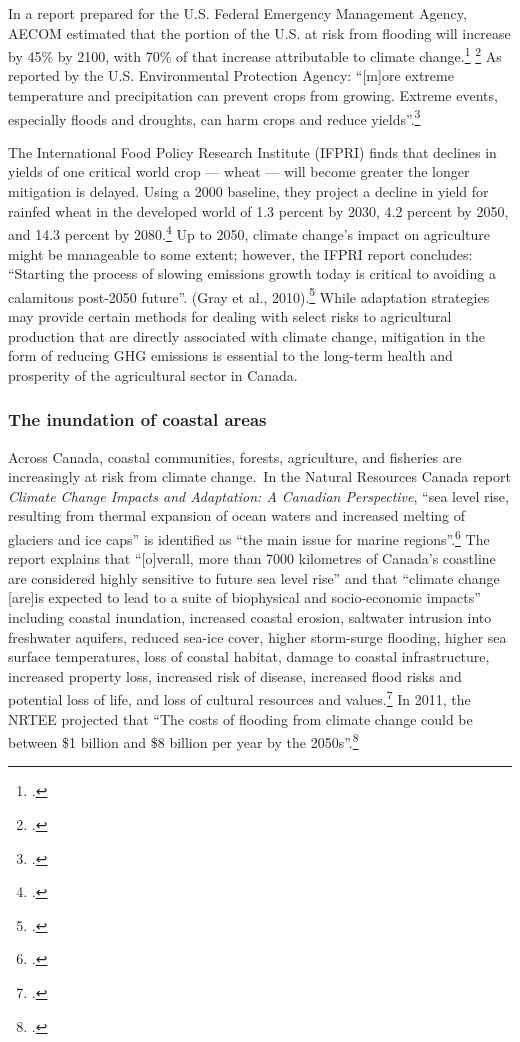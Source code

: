 In a report prepared for the U.S. Federal Emergency Management Agency, AECOM estimated that the portion of the U.S. at risk from flooding will increase by 45\% by 2100, with 70\% of that increase attributable to climate change.\footcite[][p. ES-7]{FEMAFlood} \footcite[See also: ][]{MJFlood}
As reported by the U.S. Environmental Protection Agency: ``[m]ore extreme temperature and precipitation can prevent crops from growing. Extreme events, especially floods and droughts, can harm crops and reduce yields''.\footcite[][]{EPAAgFoodImpacts}



The International Food Policy Research Institute (IFPRI) finds that declines in yields of one critical world crop --- wheat --- will become greater the longer mitigation is delayed. 
Using a 2000 baseline, they project a decline in yield for rainfed wheat in the developed world of 1.3 percent by 2030, 4.2 percent by 2050, and 14.3 percent by 2080.\footcite[][p. 85]{Farming2050}
Up to 2050, climate change's impact on agriculture might be manageable to some extent; however, the IFPRI report concludes: ``Starting the process of slowing emissions growth today is critical to avoiding a calamitous post-2050 future''. (Gray et al., 2010).\footcite[][p. 86]{Farming2050}
While adaptation strategies may provide certain methods for dealing with select risks to agricultural production that are directly associated with climate change, mitigation in the form of reducing GHG emissions is essential to the long-term health and prosperity of the agricultural sector in Canada.



	\subsubsection{The inundation of coastal areas}
	\label{sec:inundationcoastal}
	
	
Across Canada, coastal communities, forests, agriculture, and fisheries are increasingly at risk from climate change.\
In the Natural Resources Canada report \emph{Climate Change Impacts and Adaptation: A Canadian Perspective}, ``sea level rise, resulting from thermal expansion of ocean waters and increased melting of glaciers and ice caps'' is identified as ``the main issue for marine regions''.\footcite[][p. xvi]{Lemmen2010}
The report explains that ``[o]verall, more than 7000 kilometres of Canada's coastline are considered highly sensitive to future sea level rise'' and that ``climate change [are]is expected to lead to a suite of biophysical and socio-economic impacts'' including coastal inundation, increased coastal erosion, saltwater intrusion into freshwater aquifers, reduced sea-ice cover, higher storm-surge flooding, higher sea surface temperatures, loss of coastal habitat, damage to coastal infrastructure, increased property loss, increased risk of disease, increased flood risks and potential loss of life, and loss of cultural resources and values.\footcite[][p. xvii]{Lemmen2010}
In 2011, the NRTEE projected that ``The costs of flooding from climate change could be between \$1 billion and \$8 billion per year by the 2050s''.\footcite[][p.16]{NRTEEPrice}


